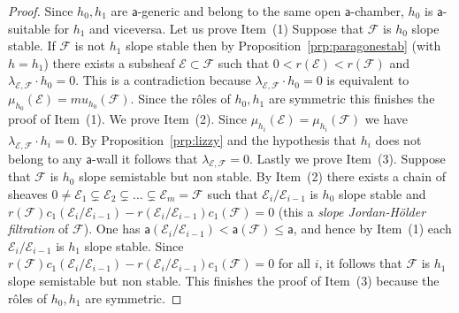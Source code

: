 \documentclass[11pt]{amsart}
\let\mathcal\mathscr
\def\cE{\mathcal{E}}
\def\cF{\mathcal{F}}
\theoremstyle{definition}
\theoremstyle{remark}
\begin{document}
\begin{proof}
%
Since $h_0,h_1$ are ${\mathsf a}$-generic  and belong to the same 
open ${\mathsf a}$-chamber, 
 $h_0$ is ${\mathsf a}$-suitable for $h_1$ and viceversa. Let us prove Item~(1) Suppose that $\cF$ is $h_0$ slope stable. If $\cF$ is not $h_1$ slope stable then by Proposition~\ref{prp:paragonestab} (with $h=h_1$)  there exists a subsheaf  $\cE\subset \cF$ such that 
$0<r(\cE)<r(\cF)$ and $\lambda_{\cE,\cF}\cdot h_0= 0$. This is a contradiction because $\lambda_{\cE,\cF}\cdot h_0= 0$ is equivalent to 
$\mu_{h_0}(\cE)=mu_{h_0}(\cF)$. Since the r\^oles of $h_0,h_1$ are symmetric this finishes the proof of Item~(1). We prove Item~(2). 
Since $\mu_{h_i}(\cE)=\mu_{h_i}(\cF)$ we have $\lambda_{\cE,\cF}\cdot h_i= 0$. 
By Proposition~\ref{prp:lizzy} and the hypothesis that $h_i$ does not belong to any ${\mathsf a}$-wall it follows that 
$\lambda_{\cE,\cF}= 0$. Lastly we prove Item~(3). Suppose that $\cF$ is $h_0$ slope semistable but non stable. By Item~(2) there exists a chain
of sheaves $0\not=\cE_1\subsetneq\cE_2\subsetneq\ldots\subsetneq\cE_m=\cF$ such that $\cE_i/\cE_{i-1}$ is $h_0$ slope stable and 
$r(\cF)c_1(\cE_i/\cE_{i-1})-r(\cE_i/\cE_{i-1})c_1(\cF)=0$ (this a \emph{slope Jordan-H\"older filtration} of $\cF$). One has 
${\mathsf a}(\cE_i/\cE_{i-1})<{\mathsf a}(\cF)\le {\mathsf a}$, and hence by Item~(1) each $\cE_i/\cE_{i-1}$ is $h_1$ slope stable. 
Since $r(\cF)c_1(\cE_i/\cE_{i-1})-r(\cE_i/\cE_{i-1})c_1(\cF)=0$ for all $i$, it follows that $\cF$ is $h_1$ slope semistable but non stable. This finishes the proof of Item~(3) because the r\^oles of $h_0,h_1$ are symmetric. 
%
\end{proof}
%



%
\end{document}
